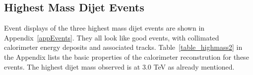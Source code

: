%

\subsection{Highest Mass Dijet Events}

Event displays of the three highest mass dijet events are shown in
Appendix~\ref{appEvents}.  They all look like good events, with
collimated calorimeter energy deposits and associated tracks.
Table~\ref{table_highmass2} in the Appendix lists the basic properties
of the calorimeter reconstrution for these events.  The highest dijet
mass observed is at 3.0 TeV as already mentioned.




